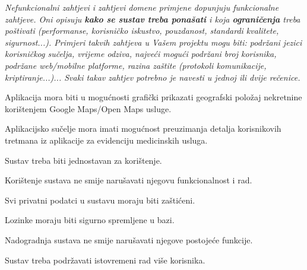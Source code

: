 			 \textit{Nefunkcionalni zahtjevi i zahtjevi domene primjene dopunjuju funkcionalne zahtjeve. Oni opisuju \textbf{kako se sustav treba ponašati} i koja \textbf{ograničenja} treba poštivati (performanse, korisničko iskustvo, pouzdanost, standardi kvalitete, sigurnost...). Primjeri takvih zahtjeva u Vašem projektu mogu biti: podržani jezici korisničkog sučelja, vrijeme odziva, najveći mogući podržani broj korisnika, podržane web/mobilne platforme, razina zaštite (protokoli komunikacije, kriptiranje...)... Svaki takav zahtjev potrebno je navesti u jednoj ili dvije rečenice.}
			 \begin{packed_item}
                \item Aplikacija mora biti u mogućnosti grafički prikazati geografski položaj nekretnine korištenjem Google Maps/Open Maps usluge.
                \item Aplikacijsko sučelje mora imati mogućnost preuzimanja detalja korisnikovih tretmana iz aplikacije za evidenciju medicinskih usluga.
                \item Sustav treba biti jednostavan za korištenje.
                \item Korištenje sustava ne smije narušavati njegovu funkcionalnost i rad.
                \item Svi privatni podatci u sustavu moraju biti zaštićeni.
                \item Lozinke moraju biti sigurno spremljene u bazi.
                \item Nadogradnja sustava ne smije narušavati njegove postojeće funkcije.
                \item Sustav treba podržavati istovremeni rad više korisnika.
		  	\end{packed_item}
			 
			 
	